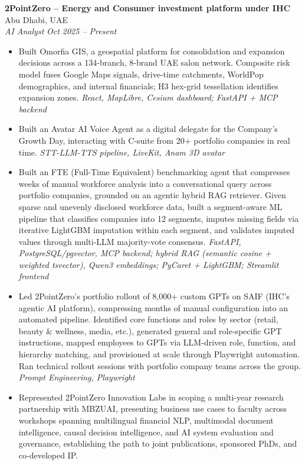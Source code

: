 \documentclass[10pt]{article}
\newcommand{\cventry}[2]{\textbf{#1} \hfill \textcolor{midtext}{#2} \\}
\newcommand{\cvrole}[2]{\textcolor{midtext}{\textit{#1}} \hfill \textcolor{midtext}{\textit{#2}} \\}
\newcommand{\stack}[1]{{\small\rmfamily\itshape\textcolor{stackgray}{#1}}}
\begin{document}
\cventry{2PointZero -- Energy and Consumer investment platform under IHC}{Abu Dhabi, UAE}
\cvrole{AI Analyst}{Oct 2025 -- Present}
\vspace{-7pt}
\begin{itemize}
    \item Built Omorfia GIS, a geospatial platform for consolidation and expansion decisions across a 134-branch, 8-brand UAE salon network. Composite risk model fuses Google Maps signals, drive-time catchments, WorldPop demographics, and internal financials; H3 hex-grid tessellation identifies expansion zones. \stack{React, MapLibre, Cesium dashboard; FastAPI + MCP backend}
    \item Built an Avatar AI Voice Agent as a digital delegate for the Company's Growth Day, interacting with C-suite from 20+ portfolio companies in real time. \stack{STT-LLM-TTS pipeline, LiveKit, Anam 3D avatar}
    \item Built an FTE (Full-Time Equivalent) benchmarking agent that compresses weeks of manual workforce analysis into a conversational query across portfolio companies, grounded on an agentic hybrid RAG retriever. Given sparse and unevenly disclosed workforce data, built a segment-aware ML pipeline that classifies companies into 12 segments, imputes missing fields via iterative LightGBM imputation within each segment, and validates imputed values through multi-LLM majority-vote consensus. \stack{FastAPI, PostgreSQL/pgvector, MCP backend; hybrid RAG (semantic cosine + weighted tsvector), Qwen3 embeddings; PyCaret + LightGBM; Streamlit frontend}
    \item Led 2PointZero's portfolio rollout of 8,000+ custom GPTs on SAIF (IHC's agentic AI platform), compressing months of manual configuration into an automated pipeline. Identified core functions and roles by sector (retail, beauty \& wellness, media, etc.), generated general and role-specific GPT instructions, mapped employees to GPTs via LLM-driven role, function, and hierarchy matching, and provisioned at scale through Playwright automation. Ran technical rollout sessions with portfolio company teams across the group. \stack{Prompt Engineering, Playwright}
    \item Represented 2PointZero Innovation Labs in scoping a multi-year research partnership with MBZUAI, presenting business use cases to faculty across workshops spanning multilingual financial NLP, multimodal document intelligence, causal decision intelligence, and AI system evaluation and governance, establishing the path to joint publications, sponsored PhDs, and co-developed IP.

\end{itemize}
\end{document}
